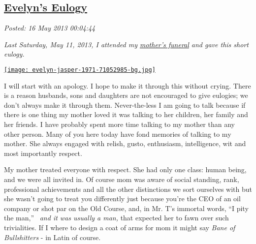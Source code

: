 %

\subsection*{\href{https://bakerjd99.wordpress.com/2013/05/15/evelyns-eulogy/}{Evelyn's Eulogy}}


\noindent\emph{Posted: 16 May 2013 00:04:44}
\vspace{6pt}

\emph{Last Saturday, May 11, 2013, I attended my
\href{http://www.franzen-davis.com/fh/obituaries/obituary.cfm?o\_id=2084629\&fh\_id=14384}{mother's
funeral} and gave this short eulogy.~}

\medskip

\captionsetup[floatingfigure]{labelformat=empty}
\begin{floatingfigure}[l]{0.25\textwidth}
\centering
\href{http://conceptcontrol.smugmug.com/People/The-Way-We-Were/7056082\_X8X9pK\#!i=473528824\&k=mkSbVJX\&lb=1\&s=A}{\texttt{[image: evelyn-jasper-1971-71052985-bg.jpg]}}
\label{fig:4027X0}
\end{floatingfigure} I will start with an apology. I hope to make it through this without
crying. There is a reason husbands, sons and daughters are not
encouraged to give eulogies; we don't always make it through them.
Never-the-less I am going to talk because if there is one thing my
mother loved it was talking to her children, her family and her friends.
I have probably spent more time talking to my mother than any other
person. Many of you here today have fond memories of talking to my
mother. She always engaged with relish, gusto, enthusiasm, intelligence,
wit and most importantly respect.

My mother treated everyone with respect. She had only one class: human
being, and we were all invited in. Of course mom was aware of social
standing, rank, professional achievements and all the other distinctions
we sort ourselves with but she wasn't going to treat you differently
just because you're the CEO of an oil company or shot par on the Old
Course, and, in Mr. T's immortal words, ``I pity the man,'' ~\emph{and
it was usually a man,} that expected her to fawn over such trivialities.
If I where to design a coat of arms for mom it might say \emph{Bane of
Bullshitters} - in Latin of course.

